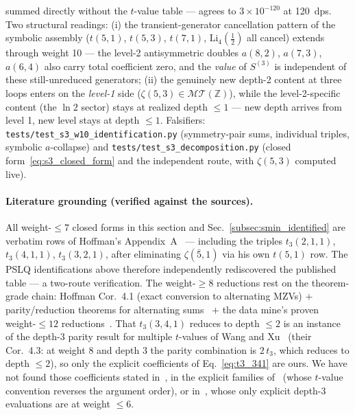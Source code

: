 \documentclass[11pt]{article}
\newcommand{\MT}{\mathcal{MT}}
\newcommand{\Z}{\mathbb{Z}}
\begin{document}
summed directly without the $t$-value table --- agrees to
$3\times10^{-120}$ at 120~dps.  Two structural readings: (i) the
transient-generator cancellation pattern of the symbolic assembly
($t(5,1)$, $t(5,3)$, $t(7,1)$, $\mathrm{Li}_4(\tfrac12)$ all cancel)
extends through weight 10 --- the level-2 antisymmetric doubles
$a(8,2)$, $a(7,3)$, $a(6,4)$ also carry total coefficient zero, and
the \emph{value} of $S^{(3)}$ is independent of these still-unreduced
generators; (ii) the genuinely new depth-2 content at three loops
enters on the \emph{level-1} side ($\zeta(5,3) \in \MT(\Z)$), while
the level-2-specific content (the $\ln 2$ sector) stays at realized
depth $\le 1$ --- new depth arrives from level 1, new level stays at
depth $\le 1$.  Falsifiers:
\texttt{tests/test\_s3\_w10\_identification.py} (symmetry-pair sums,
individual triples, symbolic $a$-collapse) and
\texttt{tests/test\_s3\_decomposition.py} (closed
form~\eqref{eq:s3_closed_form} and the independent route, with
$\zeta(5,3)$ computed live).

\paragraph{Literature grounding (verified against the sources).}
All weight-$\le 7$ closed forms in this section and
Sec.~\ref{subsec:smin_identified} are verbatim rows of Hoffman's
Appendix~A~\cite{hoffman2019odd} --- including the triples
$t_3(2,1,1)$, $t_3(4,1,1)$, $t_3(3,2,1)$, after eliminating
$\zeta(\bar 5,1)$ via his own $t(5,1)$ row.  The PSLQ identifications
above therefore independently rediscovered the published table --- a
two-route verification.  The weight-$\ge 8$ reductions rest on the
theorem-grade chain: Hoffman Cor.~4.1 (exact conversion to alternating
MZVs) $+$ parity/reduction theorems for alternating
sums~\cite{borwein1995,panzer2017} $+$ the data mine's proven
weight-$\le 12$ reductions~\cite{bbv2010}.  That $t_3(3,4,1)$ reduces
to depth $\le 2$ is an instance of the depth-3 parity result for
multiple $t$-values of Wang and Xu~\cite{wangxu2025} (their Cor.~4.3:
at weight $8$ and depth $3$ the parity combination is $2\,t_3$, which
reduces to depth $\le 2$), so only the explicit coefficients of
Eq.~\eqref{eq:t3_341} are ours.  We have not found those coefficients
stated in~\cite{hoffman2019odd}, in the explicit families
of~\cite{charltonhoffman2022} (whose $t$-value convention reverses the
argument order), or in~\cite{wangxu2025}, whose only explicit depth-3
evaluations are at weight $\le 6$.

\end{document}
